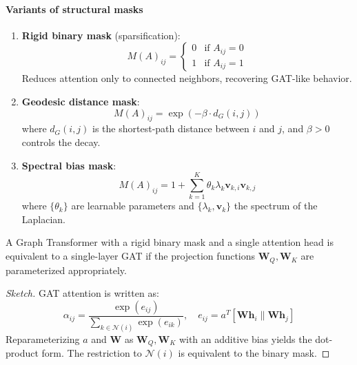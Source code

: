 \paragraph{Variants of structural masks}

\begin{enumerate}
    \item \textbf{Rigid binary mask} (sparsification):
    \begin{equation}
        M(A)_{ij} = \begin{cases}
            0 & \text{if } A_{ij} = 0 \\
            1 & \text{if } A_{ij} = 1
        \end{cases}
        \label{eq:binary_mask}
    \end{equation}
    Reduces attention only to connected neighbors, recovering \gls{GAT}-like behavior.

    \item \textbf{Geodesic distance mask}:
    \begin{equation}
        M(A)_{ij} = \exp\left(-\beta \cdot d_G(i,j)\right)
        \label{eq:geodesic_mask}
    \end{equation}
    where $d_G(i,j)$ is the shortest-path distance between $i$ and $j$, and $\beta > 0$ controls the decay.

    \item \textbf{Spectral bias mask}:
    \begin{equation}
        M(A)_{ij} = 1 + \sum_{k=1}^{K} \theta_k \lambda_k \mathbf{v}_{k,i} \mathbf{v}_{k,j}
        \label{eq:spectral_bias_mask}
    \end{equation}
    where $\{\theta_k\}$ are learnable parameters and $\{\lambda_k, \mathbf{v}_k\}$ the spectrum of the Laplacian.
\end{enumerate}

\begin{theorem}\label{thm:gat_graphtransformer_equivalence}
A Graph \gls{Transformer} with a rigid binary mask and a single attention head is equivalent to a single-layer \gls{GAT} if the projection functions $\mathbf{W}_Q, \mathbf{W}_K$ are parameterized appropriately.
\end{theorem}

\begin{proof}[Sketch]
\gls{GAT} attention is written as:
\begin{equation}
    \alpha_{ij} = \frac{\exp(e_{ij})}{\sum_{k \in \mathcal{N}(i)} \exp(e_{ik})}, \quad e_{ij} = a^T[\mathbf{W}\mathbf{h}_i \| \mathbf{W}\mathbf{h}_j]
\end{equation}
Reparameterizing $a$ and $\mathbf{W}$ as $\mathbf{W}_Q, \mathbf{W}_K$ with an additive bias yields the dot-product form. The restriction to $\mathcal{N}(i)$ is equivalent to the binary mask.
\end{proof}


